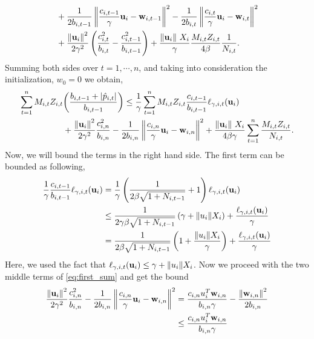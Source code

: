 {\begin{equation*}
\begin{split}
&+\frac{1}{2b_{i,t-1}}\left\Vert {\frac{c_{i,t-1}}{\gamma} \mathbf{u}_i-\mathbf{w}_{i,t-1}} \right\Vert^2-\frac{1}{2b_{i,t}}\left\Vert {\frac{c_{i,t}}{\gamma} \mathbf{u}_i-\mathbf{w}_{i,t}} \right\Vert^2\\
&+\frac{\left\Vert {\mathbf{u}_i} \right\Vert^2}{2\gamma^2}\left({\frac{c_{i,t}^2}{b_{i,t}}-\frac{c_{i,t-1}^2}{b_{i,t-1}}}\right)+
\frac{\Vert\mathbf{u}_i\Vert~ X_i}{\gamma}\frac{M_{i,t}Z_{i,t}}{4\beta}\frac{1}{N_{i,t}}.
\end{split}
\end{equation*}
Summing  both sides over $t=1,\cdots,n$, and taking into consideration the initialization,   $w_0=0$ we obtain,
\begin{equation}
\begin{split}
\sum_{t=1}^{n}M_{i,t}Z_{i,t}&{\left({\frac{b_{i,t-1} +\left\vert{\hat{p}_{i,t}}\right\vert}{b_{i,t-1}}}\right)} \le \frac{1}{\gamma}\sum_{t=1}^{n}{M_{i,t}Z_{i,t}\frac{c_{i,t-1}}{b_{i,t-1}}\ell_{\gamma,i,t}(\mathbf{u}_i)}\\
&+\frac{\left\Vert {\mathbf{u}_i} \right\Vert^2}{2\gamma^2}\frac{c_{i,n}^2}{b_{i,n}}-\frac{1}{2b_{i,n}}\left\Vert {\frac{c_{i,n}}{\gamma} \mathbf{u}_i-\mathbf{w}_{i,n}} \right\Vert^2
+\frac{\Vert\mathbf{u}_i\Vert~ X_i}{4\beta\gamma}\sum_{t=1}^{n}{\frac{M_{i,t}Z_{i,t}}{N_{i,t}}}.
\label{eq:first_sum}
\end{split}
\end{equation}
Now, we will bound the terms in the right hand side. The first term can be bounded as following,
\begin{equation*}
\begin{split}
\frac{1}{\gamma}\frac{c_{i,t-1}}{b_{i,t-1}}\ell_{\gamma,i,t}(\mathbf{u}_i)&=\frac{1}{\gamma}\left({\frac{1}{2\beta\sqrt{1+N_{i,t-1}}}+1}\right)\ell_{\gamma,i,t}(\mathbf{u}_i)\\
&\le \frac{1}{2\gamma\beta\sqrt{1+N_{i,t-1}}}\left({\gamma+\Vert u_i\Vert X_i}\right)+\frac{\ell_{\gamma,i,t}(\mathbf{u}_i)}{\gamma}\\
&=\frac{1}{2\beta\sqrt{1+N_{i,t-1}}}\left({1+\frac{\Vert u_i\Vert X_i}{\gamma}}\right)+\frac{\ell_{\gamma,i,t}(\mathbf{u}_i)}{\gamma}
\end{split}
\end{equation*}
Here, we used  the fact that $\ell_{\gamma,i,t}(\mathbf{u}_i)\le \gamma+\Vert u_i\Vert X_i$.
Now we proceed  with  the two middle terms of \eqref{eq:first_sum} and get the bound
\begin{equation*}
\begin{split}
\frac{\normt{\vu_i}}{2\gamma^2}\frac{c_{i,n}^2}{b_{i,n}}-\frac{1}{2b_{i,n}}\normt{\frac{c_{i,n}}{\gamma} \vu_i-\vwi{i,n}}
&=\frac{c_{i,n}u_i^T\vwi{i,n}}{b_{i,n}\gamma}-\frac{\normt{\vw_{i,n}}}{2b_{i,n}}\\
&\le \frac{c_{i,n}u_i^T\vwi{i,n}}{b_{i,n}\gamma}\\

\end{split}
\end{equation*}}
